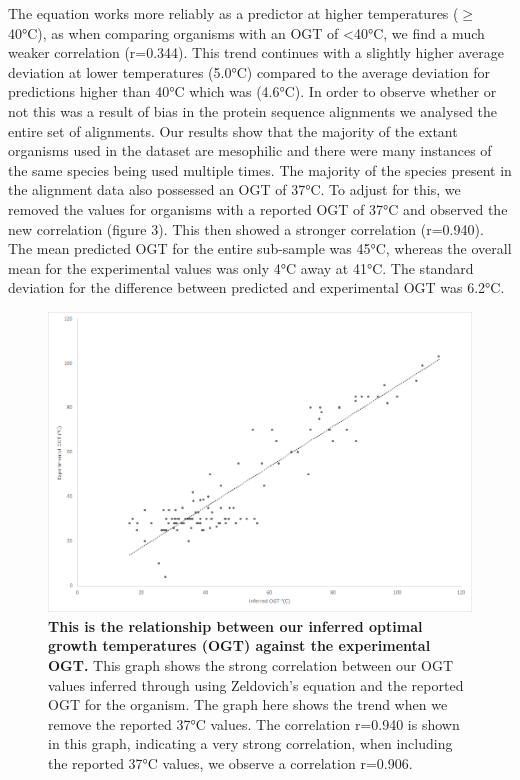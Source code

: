 The equation works more reliably as a predictor at higher temperatures ($\geq$40°C), as when comparing organisms with an OGT of <40°C, we find a much weaker correlation (r=0.344). This trend continues with a slightly higher average deviation at lower temperatures (5.0°C) compared to the average deviation for predictions higher than 40°C which was (4.6°C). In order to observe whether or not this was a result of bias in the protein sequence alignments we analysed the entire set of alignments. Our results show that the majority of the extant organisms used in the dataset are mesophilic and there were many instances of the same species being used multiple times. The majority of the species present in the alignment data also possessed an OGT of 37°C. To adjust for this, we removed the values for organisms with a reported OGT of 37°C and observed the new correlation (figure 3). This then showed a stronger correlation (r=0.940). The mean predicted OGT for the entire sub-sample was 45°C, whereas the overall mean for the experimental values was only 4°C away at 41°C. The standard deviation for the difference between predicted and experimental OGT was 6.2°C.

\begin{figure}
\includegraphics[width=\textwidth]{figures/experimental.png}
\centering
\caption{\textbf{This is the relationship between our inferred optimal growth temperatures (OGT) against the experimental OGT.} This graph shows the strong correlation between our OGT values inferred through using Zeldovich's \cite{zeldovich2007} equation and the reported OGT for the organism. The graph here shows the trend when we remove the reported 37°C values. The correlation r=0.940 is shown in this graph, indicating a very strong correlation, when including the reported 37°C values, we observe a correlation r=0.906.}
\end{figure}

